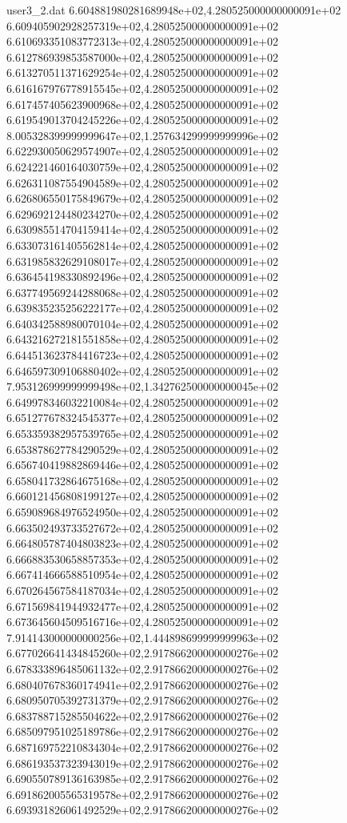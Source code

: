 \begin{filecontents}{user3_2.dat}
6.604881980281689948e+02,4.280525000000000091e+02
6.609405902928257319e+02,4.280525000000000091e+02
6.610693351083772313e+02,4.280525000000000091e+02
6.612786939853587000e+02,4.280525000000000091e+02
6.613270511371629254e+02,4.280525000000000091e+02
6.616167976778915545e+02,4.280525000000000091e+02
6.617457405623900968e+02,4.280525000000000091e+02
6.619549013704245226e+02,4.280525000000000091e+02
8.005328399999999647e+02,1.257634299999999996e+02
6.622930050629574907e+02,4.280525000000000091e+02
6.624221460164030759e+02,4.280525000000000091e+02
6.626311087554904589e+02,4.280525000000000091e+02
6.626806550175849679e+02,4.280525000000000091e+02
6.629692124480234270e+02,4.280525000000000091e+02
6.630985514704159414e+02,4.280525000000000091e+02
6.633073161405562814e+02,4.280525000000000091e+02
6.631985832629108017e+02,4.280525000000000091e+02
6.636454198330892496e+02,4.280525000000000091e+02
6.637749569244288068e+02,4.280525000000000091e+02
6.639835235256222177e+02,4.280525000000000091e+02
6.640342588980070104e+02,4.280525000000000091e+02
6.643216272181551858e+02,4.280525000000000091e+02
6.644513623784416723e+02,4.280525000000000091e+02
6.646597309106880402e+02,4.280525000000000091e+02
7.953126999999999498e+02,1.342762500000000045e+02
6.649978346032210084e+02,4.280525000000000091e+02
6.651277678324545377e+02,4.280525000000000091e+02
6.653359382957539765e+02,4.280525000000000091e+02
6.653878627784290529e+02,4.280525000000000091e+02
6.656740419882869446e+02,4.280525000000000091e+02
6.658041732864675168e+02,4.280525000000000091e+02
6.660121456808199127e+02,4.280525000000000091e+02
6.659089684976524950e+02,4.280525000000000091e+02
6.663502493733527672e+02,4.280525000000000091e+02
6.664805787404803823e+02,4.280525000000000091e+02
6.666883530658857353e+02,4.280525000000000091e+02
6.667414666588510954e+02,4.280525000000000091e+02
6.670264567584187034e+02,4.280525000000000091e+02
6.671569841944932477e+02,4.280525000000000091e+02
6.673645604509516716e+02,4.280525000000000091e+02
7.914143000000000256e+02,1.444898699999999963e+02
6.677026641434845260e+02,2.917866200000000276e+02
6.678333896485061132e+02,2.917866200000000276e+02
6.680407678360174941e+02,2.917866200000000276e+02
6.680950705392731379e+02,2.917866200000000276e+02
6.683788715285504622e+02,2.917866200000000276e+02
6.685097951025189786e+02,2.917866200000000276e+02
6.687169752210834304e+02,2.917866200000000276e+02
6.686193537323943019e+02,2.917866200000000276e+02
6.690550789136163985e+02,2.917866200000000276e+02
6.691862005565319578e+02,2.917866200000000276e+02
6.693931826061492529e+02,2.917866200000000276e+02

\end{filecontents}
